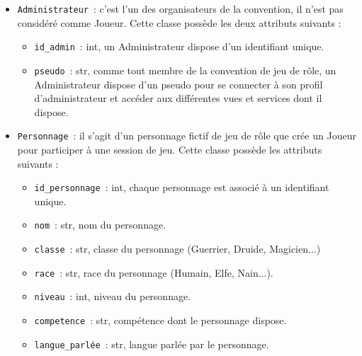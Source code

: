 \documentclass[11pt]{article}
\begin{document}
\begin{itemize}
    \item \texttt{Administrateur}~: c'est l'un des organisateurs de la convention, il n’est pas considéré comme Joueur. Cette classe possède les deux attributs suivants :
    \begin{itemize}[label=, font=\small]
        \item \texttt{id\_admin}~: int, un Administrateur dispose d'un identifiant unique.
        \item \texttt{pseudo}~: str, comme tout membre de la convention de jeu de rôle, un Administrateur dispose d'un pseudo pour se connecter à son profil d'administrateur et accéder aux différentes vues et services dont il dispose.
    \end{itemize}
    
    \item \texttt{Personnage}~: il s'agit d'un personnage fictif de jeu de rôle que crée un Joueur pour participer à une session de jeu. Cette classe possède les attributs suivants :
    \begin{itemize}[label=, font=\small]
        \item \texttt{id\_personnage}~: int, chaque personnage est associé à un identifiant unique.
        \item \texttt{nom}~: str, nom du personnage.
        \item \texttt{classe}~: str, classe du personnage (Guerrier, Druide, Magicien...)
        \item \texttt{race}~: str, race du personnage (Humain, Elfe, Nain...).
        \item \texttt{niveau}~: int, niveau du personnage.
        \item \texttt{competence}~: str, compétence dont le personnage dispose.
        \item \texttt{langue\_parlée}~: str, langue parlée par le personnage.
    \end{itemize}


\end{itemize}
\end{document}
